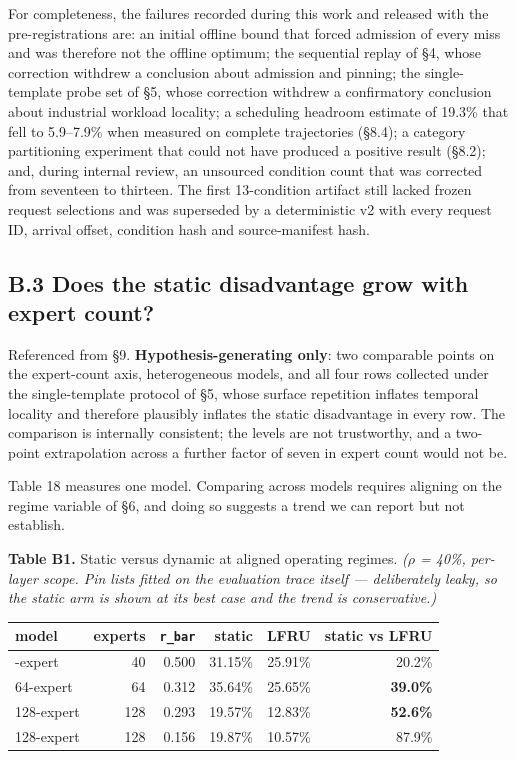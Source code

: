\documentclass[
  10pt,
  letterpaper,
  10pt]{article}
\newcounter{none} %
\begin{document}
For completeness, the failures recorded during this work and released
with the pre-registrations are: an initial offline bound that forced
admission of every miss and was therefore not the offline optimum; the
sequential replay of §4, whose correction withdrew a conclusion about
admission and pinning; the single-template probe set of §5, whose
correction withdrew a confirmatory conclusion about industrial workload
locality; a scheduling headroom estimate of 19.3\% that fell to
5.9--7.9\% when measured on complete trajectories (§8.4); a category
partitioning experiment that could not have produced a positive result
(§8.2); and, during internal review, an unsourced condition count that
was corrected from seventeen to thirteen. The first 13-condition
artifact still lacked frozen request selections and was superseded by a
deterministic v2 with every request ID, arrival offset, condition hash
and source-manifest hash.

\subsection{B.3 Does the static disadvantage grow with expert
count?}\label{b.3-does-the-static-disadvantage-grow-with-expert-count}

Referenced from §9. \textbf{Hypothesis-generating only}: two comparable
points on the expert-count axis, heterogeneous models, and all four rows
collected under the single-template protocol of §5, whose surface
repetition inflates temporal locality and therefore plausibly inflates
the static disadvantage in every row. The comparison is internally
consistent; the levels are not trustworthy, and a two-point
extrapolation across a further factor of seven in expert count would not
be.

Table 18 measures one model. Comparing across models requires aligning
on the regime variable of §6, and doing so suggests a trend we can
report but not establish.

\textbf{Table B1.} Static versus dynamic at aligned operating regimes.
\emph{(\ensuremath{\rho} = 40\%, per-layer scope. Pin lists fitted on
the evaluation trace itself --- deliberately leaky, so the static arm is
shown at its best case and the trend is conservative.)}

{\def\LTcaptype{none} %
\begin{longtable}[]{@{}lrrrrr@{}}
\toprule\noalign{}
model & experts & \texttt{r\_bar} & static & LFRU & static vs LFRU \\
\midrule\noalign{}
\endhead
\bottomrule\noalign{}
\endlastfoot
40-expert & 40 & 0.500 & 31.15\% & 25.91\% & \textminus{}20.2\% \\
64-expert & 64 & 0.312 & 35.64\% & 25.65\% &
\textbf{\textminus{}39.0\%} \\
128-expert & 128 & 0.293 & 19.57\% & 12.83\% &
\textbf{\textminus{}52.6\%} \\
128-expert & 128 & 0.156 & 19.87\% & 10.57\% & \textminus{}87.9\% \\
\end{longtable}
}
\end{document}
